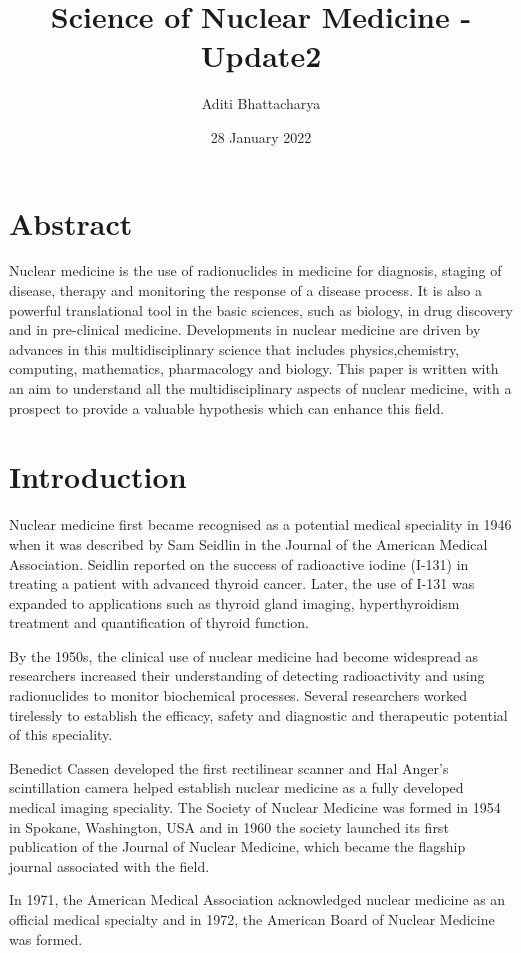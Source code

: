 \documentclass{article}
\title{\textbf{Science of Nuclear Medicine - Update2}}
\author{Aditi Bhattacharya}
\date{28 January 2022}
\begin{document}
\maketitle
\section*{Abstract}
Nuclear medicine is the use of radionuclides in medicine for diagnosis, staging of disease, therapy and monitoring the response of a disease process. It is also a powerful translational tool in the basic sciences, such as biology, in drug discovery and in pre-clinical medicine. Developments in nuclear medicine are driven by advances in this multidisciplinary science that includes physics,chemistry, computing, mathematics, pharmacology and biology. This paper is written with an aim to understand all the multidisciplinary aspects of nuclear medicine, with a prospect to provide a valuable hypothesis which can enhance this field.

\section*{Introduction}
Nuclear medicine first became recognised as a potential medical speciality in 1946 when it was described by Sam Seidlin in the Journal of the American Medical Association. Seidlin reported on the success of radioactive iodine (I-131) in treating a patient with advanced thyroid cancer. Later, the use of I-131 was expanded to applications such as thyroid gland imaging, hyperthyroidism treatment and quantification of thyroid function.

By the 1950s, the clinical use of nuclear medicine had become widespread as researchers increased their understanding of detecting radioactivity and using radionuclides to monitor biochemical processes. Several researchers worked tirelessly to establish the efficacy, safety and diagnostic and therapeutic potential of this speciality.

Benedict Cassen developed the first rectilinear scanner and Hal Anger’s scintillation camera helped establish nuclear medicine as a fully developed medical imaging speciality. The Society of Nuclear Medicine was formed in 1954 in Spokane, Washington, USA and in 1960 the society launched its first publication of the Journal of Nuclear Medicine, which became the flagship journal associated with the field.

In 1971, the American Medical Association acknowledged nuclear medicine as an official medical specialty and in 1972, the American Board of Nuclear Medicine was formed.
\end{document}
